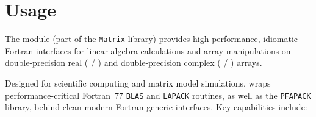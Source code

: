\section{Usage}
\label{sec:usage}

The  module (part of the \texttt{Matrix} library) provides high-performance, idiomatic Fortran interfaces for linear algebra calculations and array manipulations on double-precision real ( / ) and double-precision complex ( / ) arrays.

Designed for scientific computing and matrix model simulations,  wraps performance-critical Fortran~77 \texttt{BLAS} and \texttt{LAPACK} routines, as well as the \texttt{PFAPACK} library, behind clean modern Fortran generic interfaces. Key capabilities include:
